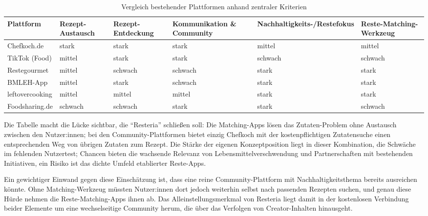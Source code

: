 \begin{table}[H]
\caption{Vergleich bestehender Plattformen anhand zentraler Kriterien}\label{tab:wettbewerbsvergleich}
{\footnotesize
\begin{tabularx}{\textwidth}{@{}l>{\centering\arraybackslash}X>{\centering\arraybackslash}X>{\centering\arraybackslash}X>{\centering\arraybackslash}X>{\centering\arraybackslash}X@{}}
\toprule
\textbf{Plattform} & \textbf{Rezept-Austausch} & \textbf{Rezept-Entdeckung} & \textbf{Kommunikation \& Community} & \textbf{Nach\-hal\-tig\-keits-/\allowbreak Restefokus} & \textbf{Reste-Matching-Werkzeug} \\
\midrule
Chefkoch.de & stark & stark & stark & mittel & mittel \\
TikTok (Food) & mittel & stark & stark & schwach & schwach \\
Restegourmet & mittel & schwach & schwach & stark & stark \\
\ac{BMLEH}-App & mittel & stark & schwach & stark & stark \\
leftovercooking & mittel & mittel & mittel & stark & stark \\
Foodsharing.de & schwach & schwach & stark & stark & schwach \\
\bottomrule
\end{tabularx}
}
\end{table}

Die Tabelle macht die Lücke sichtbar, die \enquote{Resteria} schließen soll: Die Matching-Apps lösen das Zutaten-Problem ohne Austausch zwischen den Nutzer:innen; bei den Community-Plattformen bietet einzig Chefkoch mit der kostenpflichtigen Zutatensuche einen entsprechenden Weg von übrigen Zutaten zum Rezept. Die Stärke der eigenen Konzeptposition liegt in dieser Kombination, die Schwäche im fehlenden Nutzertest; Chancen bieten die wachsende Relevanz von Lebensmittelverschwendung und Partnerschaften mit bestehenden Initiativen, ein Risiko ist das dichte Umfeld etablierter Reste-Apps.

Ein gewichtiger Einwand gegen diese Einschätzung ist, dass eine reine Community-Plattform mit Nachhaltigkeitsthema bereits ausreichen könnte. Ohne Matching-Werkzeug müssten Nutzer:innen dort jedoch weiterhin selbst nach passenden Rezepten suchen, und genau diese Hürde nehmen die Reste-Matching-Apps ihnen ab. Das Alleinstellungsmerkmal von Resteria liegt damit in der kostenlosen Verbindung beider Elemente um eine wechselseitige Community herum, die über das Verfolgen von Creator-Inhalten hinausgeht.
